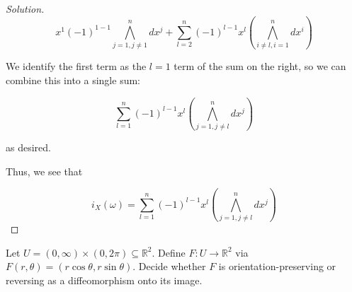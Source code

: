\documentclass[10pt]{article}
\theoremstyle{nonumberplain}%
\newenvironment{problem}[2][]{\begin{trivlist}
\item[\hskip \labelsep {\bfseries #1}\hskip \labelsep {\bfseries #2.}]}{\end{trivlist}}
\begin{document}
\begin{proof}[Solution]
$$ x^1 (-1)^{1-1} \bigwedge_{j=1, j \not =1 }^n dx^j + \sum_{l=2}^n (-1)^{l-1} x^l \left(\bigwedge_{i\not =l, i =1}^n dx^i \right) $$ 

We identify the first term as the $l=1$ term of the sum on the right, so we can combine this into a single sum:

$$ \sum_{l=1}^n (-1)^{l-1} x^l \left(\bigwedge_{j=1, j\not =l}^n dx^j\right) $$

as desired.

Thus, we see that

$$ i_X(\omega) = \sum_{l=1}^n (-1)^{l-1} x^l \left(\bigwedge_{j=1, j\not =l}^n dx^j\right) $$

\end{proof}



\begin{problem}{Question 6}

Let $U = (0, \infty) \times (0, 2\pi) \subseteq \mathbb{R}^2$. Define $F: U \to \mathbb{R}^2$ via $F(r, \theta) = (r \cos \theta, r \sin \theta)$. Decide whether $F$ is orientation-preserving or reversing as a diffeomorphism onto its image.

\end{problem}
\end{document}
